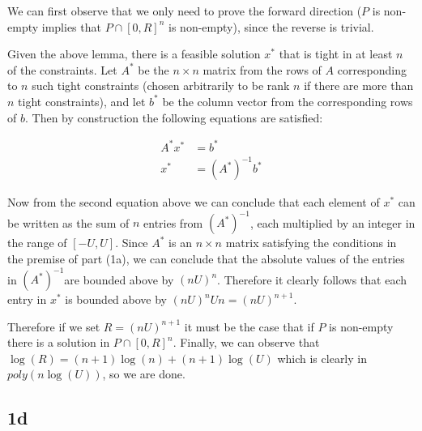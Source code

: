 \documentclass{article}
\newcommand{\astarinv}{$(A^*)^{-1}$}
\begin{document}
We can first observe that we only need to prove the forward direction
($P$ is non-empty implies that $P \cap [0, R]^n$ is non-empty),
since the reverse is trivial. 

Given the above lemma,
there is a feasible solution $x^*$ that is tight in at least $n$
of the constraints. Let $A^*$ be the $n \times n$ matrix from the rows
of $A$ corresponding to $n$ such tight constraints (chosen arbitrarily to be
rank $n$ if there are more than $n$ tight constraints), and let $b^*$ be the
column vector from the corresponding rows of $b$.  Then by construction the
following equations are satisfied:

\begin{align}
  A^* x^* &= b^* \\
  x^* &= (A^*)^{-1} b^* 
\end{align}

Now from the second equation above we can conclude that each element
of $x^*$ can be written as the sum of $n$ entries from \astarinv,
each multiplied by an integer in the range of $[-U, U]$. Since $A^*$
is an $n \times n$ matrix satisfying the conditions in the premise
of part (1a), we can conclude that the absolute values of the
entries in \astarinv are bounded above by $(nU)^n$. Therefore it
clearly follows that each entry in $x^*$ is bounded above by
$(nU)^n U n = (nU)^{n + 1}$.

Therefore if we set
$R = (nU)^{n + 1}$ it must be the case that if $P$ is
non-empty there is a solution in $P \cap [0, R]^n$.
Finally, we can observe that $\log(R) = (n + 1)\log(n) + (n + 1)\log(U)$
which is clearly in $poly(n\log(U))$, so we are done.


\subsection*{1d}
\end{document}
